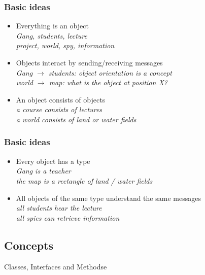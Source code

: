 \documentclass[UTF8]{beamer}
\begin{document}
\begin{frame}
  \frametitle{Basic ideas}

  \begin{itemize}
  \item \alert{Everything is an object}\\
    \emph{Gang, students, lecture}\\
    \emph{project, world, spy, information}
  \item \alert{Objects interact by sending/receiving messages}\\
    \emph{Gang $\rightarrow$ students: object orientation is a concept}\\
    \emph{world $\rightarrow$ map: what is the object at
      position X?}\\
  \item \alert{An object consists of objects}\\
    \emph{a course consists of lectures}\\
    \emph{a world consists of land or water fields}\\
  \end{itemize}
\end{frame}


\begin{frame}
  \frametitle{Basic ideas}
  \begin{itemize}
  \item \alert{Every object has a type}\\
    \emph{Gang is a teacher}\\
    \emph{the map is a rectangle of land / water fields}
  \item \alert{All objects of the same type understand the same messages}\\
    \emph{all students hear the lecture}\\
    \emph{all spies can retrieve information}
  \end{itemize}
\end{frame}


\subsection{Concepts}
\begin{frame}[t]{Classes, Interfaces and Methodse}
\end{frame}
\end{document}
